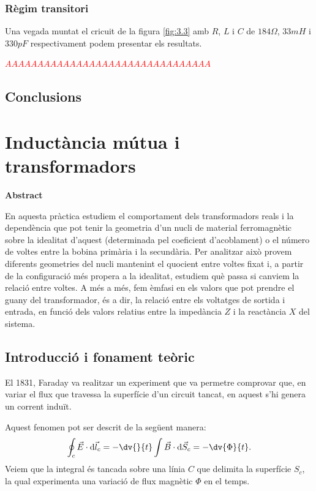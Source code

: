 \documentclass[a4paper,10.5pt]{report}
\newenvironment{chapterabstract}{
	\begin{center}
		\bfseries Abstract
	\end{center}
	\quotation
}{\endquotation}
\begin{document}
\subsection{Règim transitori}
Una vegada muntat el cricuit de la figura \ref{fig:3.3} amb $R$, $L$ i $C$ de $184\Omega$, $33mH$ i $330pF$ respectivament podem presentar els resultats. 

\textcolor{red}{$AAAAAAAAAAAAAAAAAAAAAAAAAAAAAAAA$}

\section{Conclusions}


\chapter{Inductància mútua i transformadors}

\begin{chapterabstract}
	En aquesta pràctica estudiem el comportament dels transformadors reals i la dependència que pot tenir la geometria d'un nucli de material ferromagnètic sobre la idealitat d'aquest (determinada pel coeficient d'acoblament) o el número de voltes entre la bobina primària i la secundària. Per analitzar això provem diferents geometries del nucli mantenint el quocient entre voltes fixat i, a partir de la configuració més propera a la idealitat, estudiem què passa si canviem la relació entre voltes. A més a més, fem èmfasi en els valors que pot prendre el guany del transformador, és a dir, la relació entre els voltatges de sortida i entrada, en funció dels valors relatius entre la impedància $Z$ i la reactància $X$ del sistema.
\end{chapterabstract}

\section{Introducció i fonament teòric}
El 1831, Faraday va realitzar un experiment que va permetre comprovar que, en variar el flux que travessa la superfície d'un circuit tancat, en aquest s'hi genera un corrent induït.

Aquest fenomen pot ser descrit de la següent manera:
\begin{equation}
	\oint_c \Vec{E}\cdot \mathrm{d}\Vec{l}_c = -\dv{}{t} \int \Vec{B}\cdot \mathrm{d} \Vec{S}_c = - \dv{\Phi}{t} \label{eq:4:1}.
\end{equation}
Veiem que la integral és tancada sobre una línia $C$ que delimita la superfície $S_c$, la qual experimenta una variació de flux magnètic $\Phi$ en el temps.
\end{document}
